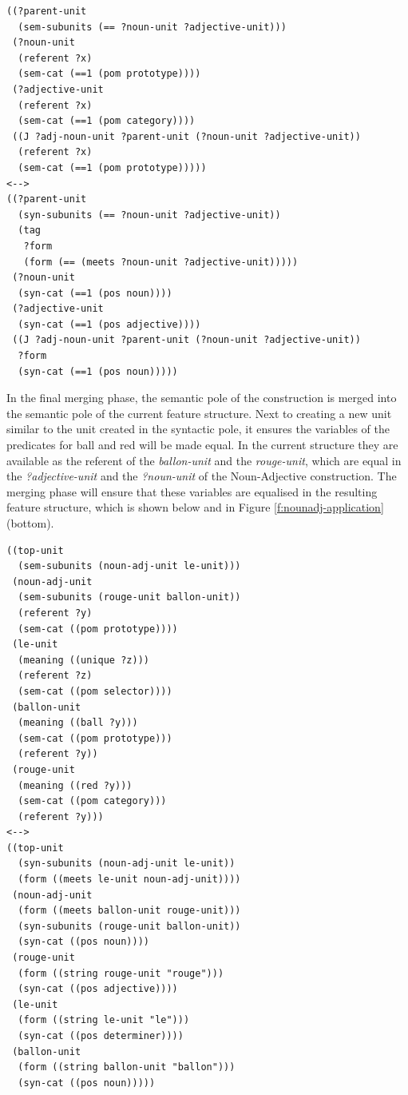 \footnotesize
\begin{Verbatim}[frame=lines, label=The Noun-Adjective construction]
((?parent-unit
  (sem-subunits (== ?noun-unit ?adjective-unit)))
 (?noun-unit 
  (referent ?x) 
  (sem-cat (==1 (pom prototype))))
 (?adjective-unit
  (referent ?x)
  (sem-cat (==1 (pom category))))
 ((J ?adj-noun-unit ?parent-unit (?noun-unit ?adjective-unit))
  (referent ?x)
  (sem-cat (==1 (pom prototype)))))
<-->
((?parent-unit
  (syn-subunits (== ?noun-unit ?adjective-unit))
  (tag
   ?form
   (form (== (meets ?noun-unit ?adjective-unit)))))
 (?noun-unit 
  (syn-cat (==1 (pos noun))))
 (?adjective-unit 
  (syn-cat (==1 (pos adjective))))
 ((J ?adj-noun-unit ?parent-unit (?noun-unit ?adjective-unit))
  ?form
  (syn-cat (==1 (pos noun)))))
\end{Verbatim}
\normalsize

In the final merging phase, the semantic pole of the construction is
merged into the semantic pole of the current feature structure. Next
to creating a new unit similar to the unit created in the syntactic
pole, it ensures the variables of the predicates for ball and red will
be made equal. In the current structure they are available as the
referent of the \emph{ballon-unit} and the \emph{rouge-unit}, which
are equal in the \emph{?adjective-unit} and the \emph{?noun-unit} of
the Noun-Adjective construction. The merging phase will ensure that
these variables are equalised in the resulting feature structure,
which is shown below and in Figure \ref{f:nounadj-application}
(bottom).

\footnotesize
\begin{Verbatim}[frame=lines, label=Structure after application in interpretation]
((top-unit
  (sem-subunits (noun-adj-unit le-unit)))
 (noun-adj-unit
  (sem-subunits (rouge-unit ballon-unit))
  (referent ?y)
  (sem-cat ((pom prototype))))
 (le-unit
  (meaning ((unique ?z)))
  (referent ?z)
  (sem-cat ((pom selector))))
 (ballon-unit
  (meaning ((ball ?y)))
  (sem-cat ((pom prototype)))
  (referent ?y))
 (rouge-unit
  (meaning ((red ?y)))
  (sem-cat ((pom category)))
  (referent ?y)))
<-->
((top-unit 
  (syn-subunits (noun-adj-unit le-unit))
  (form ((meets le-unit noun-adj-unit))))
 (noun-adj-unit
  (form ((meets ballon-unit rouge-unit)))
  (syn-subunits (rouge-unit ballon-unit))
  (syn-cat ((pos noun))))
 (rouge-unit
  (form ((string rouge-unit "rouge")))
  (syn-cat ((pos adjective))))
 (le-unit 
  (form ((string le-unit "le"))) 
  (syn-cat ((pos determiner))))
 (ballon-unit
  (form ((string ballon-unit "ballon")))
  (syn-cat ((pos noun)))))
\end{Verbatim}
\normalsize
